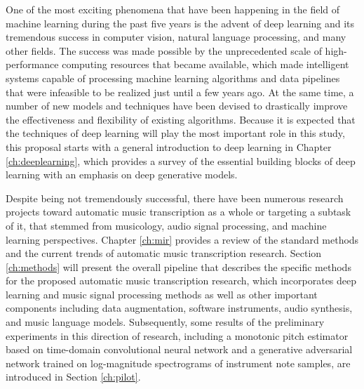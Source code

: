 One of the most exciting phenomena that have been happening in the field of machine learning during the past five years is the advent of deep learning and its tremendous success in computer vision, natural language processing, and many other fields.
The success was made possible by the unprecedented scale of high-performance computing resources that became available, which made intelligent systems capable of processing machine learning algorithms and data pipelines that were infeasible to be realized just until a few years ago.
At the same time, a number of new models and techniques have been devised to drastically improve the effectiveness and flexibility of existing algorithms.
Because it is expected that the techniques of deep learning will play the most important role in this study, this proposal starts with a general introduction to deep learning in Chapter \ref{ch:deeplearning}, which provides a survey of the essential building blocks of deep learning with an emphasis on deep generative models.

Despite being not tremendously successful, there have been numerous research projects toward automatic music transcription as a whole or targeting a subtask of it, that stemmed from musicology, audio signal processing, and machine learning perspectives.
Chapter \ref{ch:mir} provides a review of the standard methods and the current trends of automatic music transcription research.
Section \ref{ch:methods} will present the overall pipeline that describes the specific methods for the proposed automatic music transcription research, which incorporates deep learning and music signal processing methods as well as other important components including data augmentation, software instruments, audio synthesis, and music language models.
Subsequently, some results of the preliminary experiments in this direction of research, including a monotonic pitch estimator based on time-domain convolutional neural network and a generative adversarial network trained on log-magnitude spectrograms of instrument note samples, are introduced in Section \ref{ch:pilot}.
